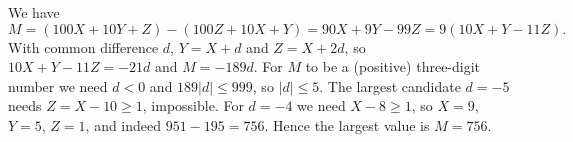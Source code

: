 We have
\[M=(100X+10Y+Z)-(100Z+10X+Y)=90X+9Y-99Z=9(10X+Y-11Z).\]
With common difference $d$, $Y=X+d$ and $Z=X+2d$, so $10X+Y-11Z=-21d$ and $M=-189d$. For $M$ to be a (positive) three-digit number we need $d<0$ and $189|d|\le999$, so $|d|\le5$. The largest candidate $d=-5$ needs $Z=X-10\ge1$, impossible. For $d=-4$ we need $X-8\ge1$, so $X=9$, $Y=5$, $Z=1$, and indeed $951-195=756$. Hence the largest value is $M=\boxed{756}$.
